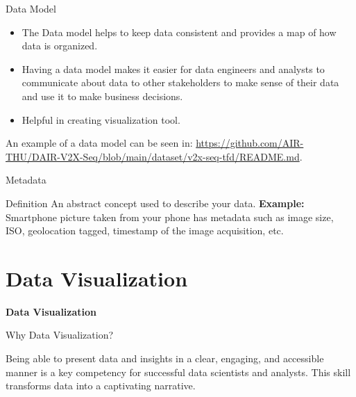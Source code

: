 \documentclass[aspectratio=169,xcolor=dvipsnames,svgnames,x11names,fleqn]{beamer}
\begin{document}
\begin{frame}{Data Model}
    \begin{facts}{}
        \begin{itemize}
            \item The Data model helps to keep data consistent and provides a map of how data is organized.
            \item Having a data model makes it easier for data engineers and analysts to communicate about data to other stakeholders to make sense of their data and use it to make business decisions.
            \item Helpful in creating visualization tool.
        \end{itemize}
    \end{facts}

    An example of a data model can be seen in: {\color{red}\url{https://github.com/AIR-THU/DAIR-V2X-Seq/blob/main/dataset/v2x-seq-tfd/README.md}}.
\end{frame}
\begin{frame}{Metadata}
    \begin{facts}{Definition}
        An abstract concept used to describe your data.
        \textbf{Example:} Smartphone picture taken from your phone has metadata such as image size, ISO, geolocation tagged, timestamp of the image acquisition, etc.
    \end{facts}
\end{frame}

\section{Data Visualization}

\begin{frame}{}
\begin{center}
    \huge \bf \color{DarkRed}
    Data Visualization
\end{center}
\end{frame}


\begin{frame}{Why Data Visualization?}

\Large 
\begin{center}
     Being able to present data and insights in a clear, engaging, and accessible manner is a key competency for successful data scientists and analysts. This skill transforms data into a captivating narrative.
\end{center}
   
\end{frame}
\end{document}
